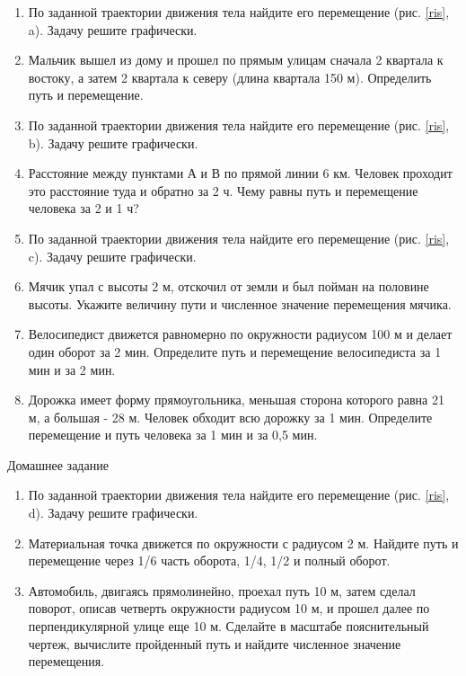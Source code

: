 \documentclass[a5paper, 10pt]{diss_4}
\renewcommand{\'}{\,'}
\begin{document}
\begin{enumerate}
\item По заданной траектории движения тела найдите его перемещение (рис. \ref{ris}, a). Задачу решите графически.

\item Мальчик вышел из дому и прошел по прямым улицам сначала 2 квартала к востоку, а затем 2 квартала к северу (длина квартала 150 м). Определить путь и перемещение.
\item По заданной траектории движения тела найдите его перемещение (рис. \ref{ris}, b). Задачу решите графически.
\item Расстояние между пунктами А и В по прямой линии 6 км. Человек проходит это расстояние туда и обратно за 2 ч. Чему равны путь и перемещение человека за 2 и 1 ч?
\item По заданной траектории движения тела найдите его перемещение (рис. \ref{ris}, c). Задачу решите графически.
\item Мячик упал с высоты 2 м, отскочил от земли и был пойман на половине высоты. Укажите величину пути и численное значение перемещения мячика.
\item Велосипедист движется равномерно по окружности радиусом 100 м и делает один оборот за 2 мин. Определите путь и перемещение велосипедиста за 1 мин и за 2 мин.
\item Дорожка имеет форму прямоугольника, меньшая сторона которого равна 21 м, а большая - 28 м. Человек обходит всю дорожку за 1 мин. Определите перемещение и путь человека за 1 мин и за 0,5 мин.
\end{enumerate}

\begin{center}
   Домашнее задание
\end{center}

\begin{enumerate}
\item По заданной траектории движения тела найдите его перемещение (рис. \ref{ris}, d). Задачу решите графически.
\item Материальная точка движется по окружности с радиусом 2 м. Найдите путь и перемещение через 1/6 часть оборота, 1/4, 1/2 и полный оборот.
\item Автомобиль, двигаясь прямолинейно, проехал путь 10 м, затем сделал поворот, описав четверть окружности радиусом 10 м, и прошел далее по перпендикулярной улице еще 10 м. Сделайте в масштабе пояснительный чертеж, вычислите пройденный путь и найдите численное значение перемещения.
\end{enumerate}
\end{document}
